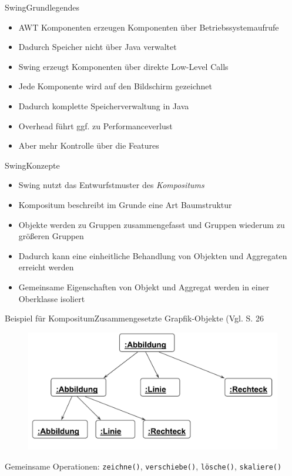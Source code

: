 \begin{frame}{Swing}{Grundlegendes}
	\begin{itemize}
		\item AWT Komponenten erzeugen Komponenten über Betriebssystemaufrufe
		\item Dadurch Speicher nicht über Java verwaltet
		\item Swing erzeugt Komponenten über direkte Low-Level Calls
		\item Jede Komponente wird auf den Bildschirm gezeichnet
		\item Dadurch komplette Speicherverwaltung in Java
		\item Overhead führt ggf. zu Performanceverlust
		\item Aber mehr Kontrolle über die Features
	\end{itemize}
\end{frame}

\begin{frame}{Swing}{Konzepte}
	\begin{itemize}
		\item Swing nutzt das Entwurfstmuster des \textit{Kompositums}
		\item Kompositum beschreibt im Grunde eine Art Baumstruktur
		\item Objekte werden zu Gruppen zusammengefasst und Gruppen wiederum zu größeren Gruppen
		\item Dadurch kann eine einheitliche Behandlung von Objekten und Aggregaten erreicht werden
		\item Gemeinsame Eigenschaften von Objekt und Aggregat werden in einer Oberklasse isoliert
	\end{itemize}
\end{frame}

\begin{frame}{Beispiel für Kompositum}{Zusammengesetzte Grapfik-Objekte (Vgl. \cite{judt2017} S. 26}
    \begin{figure}
	\includegraphics*[width=.8\textwidth]{graph/compositum_example}
    \end{figure}
	Gemeinsame Operationen: \texttt{zeichne()}, \texttt{verschiebe()}, \texttt{lösche()}, \texttt{skaliere()}
\end{frame}

